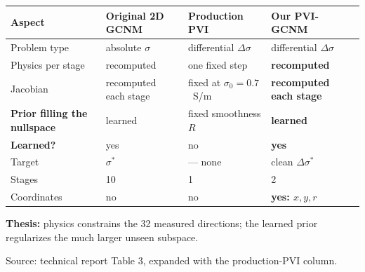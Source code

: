 \documentclass[border=6pt]{standalone}
\begin{document}
\begin{minipage}{18.4cm}

  \vspace{0.3em}
  \renewcommand{\arraystretch}{1.32}
  \setlength{\tabcolsep}{5.5pt}
  \begin{tabular}{@{}L{3.45cm}L{4.55cm}L{4.55cm}L{4.55cm}@{}}
    \toprule
    \textbf{Aspect} &
    \textbf{Original 2D GCNM} &
    \textbf{Production PVI} &
    \textbf{Our PVI-GCNM} \\
    \midrule
    Problem type & absolute $\sigma$ &
      differential $\Delta\sigma$ &
      differential $\Delta\sigma$ \\
    Physics per stage & recomputed &
      one fixed step &
      \textbf{recomputed} \\
    Jacobian & recomputed each stage &
      fixed at $\sigma_0=0.7$~S/m &
      \textbf{recomputed each stage} \\
    \textbf{Prior filling the nullspace} & learned &
      fixed smoothness $R$ & \textbf{learned} \\
    \textbf{Learned?} & yes & no & \textbf{yes} \\
    Target & $\sigma^\ast$ & --- none & clean $\Delta\sigma^\ast$ \\
    Stages & 10 & 1 & 2 \\
    Coordinates & no & no & \textbf{yes: $x,y,r$} \\
    \bottomrule
  \end{tabular}


  \vspace{0.1em}
  {\small\color{srlNavy}\textbf{Thesis:} physics constrains the 32 measured
  directions; the learned prior regularizes the much larger unseen subspace.}

  \vspace{0.25em}
  {\scriptsize\color{baselineGray}Source: technical report Table 3, expanded
  with the production-PVI column.}
\end{minipage}
\end{document}
